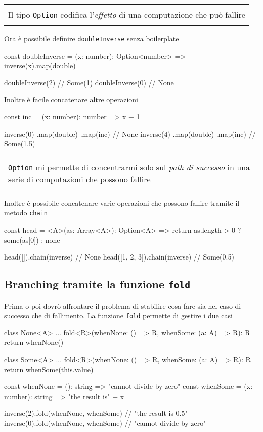 \documentclass[12pt]{article}
\theoremstyle{definition}
\newenvironment{boxed}
    {\begin{center}
    \begin{tabular}{|p{0.9\textwidth}|}
    \hline\\
    }
    {
    \\\\\hline
    \end{tabular}
    \end{center}
    }
\newenvironment{code}
  {\vspace{0.5cm} \VerbatimEnvironment\begin{typescriptcode}}
  {\end{typescriptcode} \vspace{0.2cm}}
\begin{document}
\begin{boxed}
Il tipo \texttt{Option} codifica l'\emph{effetto} di una computazione che può fallire
\end{boxed}

Ora è possibile definire \texttt{doubleInverse} senza boilerplate

\begin{code}
const doubleInverse = (x: number): Option<number> =>
  inverse(x).map(double)

doubleInverse(2) // Some(1)
doubleInverse(0) // None
\end{code}

Inoltre è facile concatenare altre operazioni

\begin{code}
const inc = (x: number): number => x + 1

inverse(0)
  .map(double)
  .map(inc) // None
inverse(4)
  .map(double)
  .map(inc) // Some(1.5)
\end{code}

\begin{boxed}
\texttt{Option} mi permette di concentrarmi solo sul \emph{path di successo} in una serie di computazioni che possono fallire
\end{boxed}

Inoltre è possibile concatenare varie operazioni che possono fallire tramite il metodo \texttt{chain}

\begin{code}
const head = <A>(as: Array<A>): Option<A> => {
  return as.length > 0 ? some(as[0]) : none
}

head([]).chain(inverse) // None
head([1, 2, 3]).chain(inverse) // Some(0.5)
\end{code}

\subsection{Branching tramite la funzione \texttt{fold}}

Prima o poi dovrò affrontare il problema di stabilire cosa fare sia nel caso di successo che di fallimento.
La funzione \texttt{fold} permette di gestire i due casi

\begin{code}
class None<A> {
  ...
  fold<R>(whenNone: () => R, whenSome: (a: A) => R): R {
    return whenNone()
  }
}

class Some<A> {
  ...
  fold<R>(whenNone: () => R, whenSome: (a: A) => R): R {
    return whenSome(this.value)
  }
}

const whenNone = (): string => "cannot divide by zero"
const whenSome = (x: number): string => "the result is" + x

inverse(2).fold(whenNone, whenSome) // "the result is 0.5"
inverse(0).fold(whenNone, whenSome) // "cannot divide by zero"
\end{code}
\end{document}
